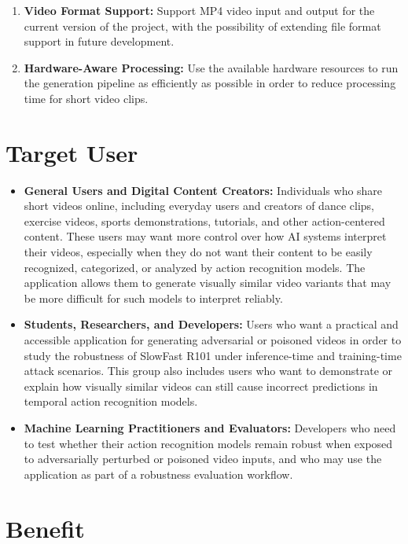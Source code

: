 \begin{enumerate}[leftmargin=80pt]
    \item \textbf{Video Format Support:} Support MP4 video input and output for the current version of the project, with the possibility of extending file format support in future development.
    
    \item \textbf{Hardware-Aware Processing:} Use the available hardware resources to run the generation pipeline as efficiently as possible in order to reduce processing time for short video clips.
\end{enumerate}

\section{Target User}
\label{section:target-user}

\begin{itemize}
    \item \textbf{General Users and Digital Content Creators:} Individuals who share short videos online, including everyday users and creators of dance clips, exercise videos, sports demonstrations, tutorials, and other action-centered content. These users may want more control over how AI systems interpret their videos, especially when they do not want their content to be easily recognized, categorized, or analyzed by action recognition models. The application allows them to generate visually similar video variants that may be more difficult for such models to interpret reliably.

    \item \textbf{Students, Researchers, and Developers:} Users who want a practical and accessible application for generating adversarial or poisoned videos in order to study the robustness of SlowFast R101 under inference-time and training-time attack scenarios. This group also includes users who want to demonstrate or explain how visually similar videos can still cause incorrect predictions in temporal action recognition models.

    \item \textbf{Machine Learning Practitioners and Evaluators:} Developers who need to test whether their action recognition models remain robust when exposed to adversarially perturbed or poisoned video inputs, and who may use the application as part of a robustness evaluation workflow.
\end{itemize}

\section{Benefit}
\label{section:benefit}

